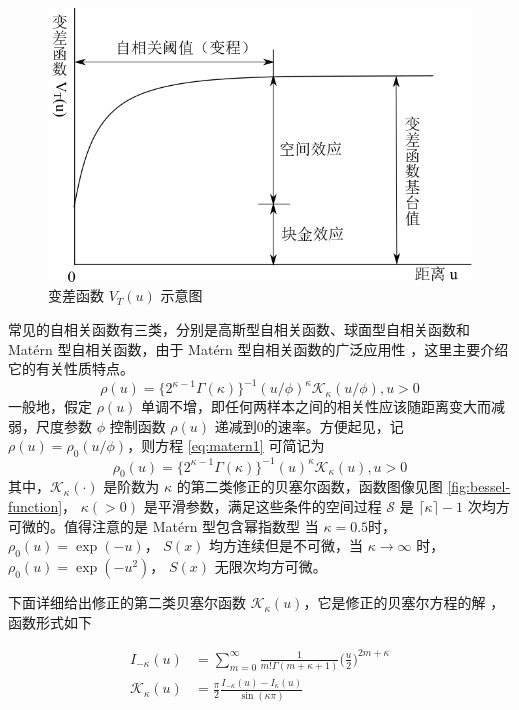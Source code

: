 \documentclass[12pt,a4paper,UTF8,twoside]{book}
\theoremstyle{definition}
\theoremstyle{definition}
\theoremstyle{definition}
\theoremstyle{remark}
\begin{document}
\begin{figure}

{\centering \includegraphics[width=0.7\linewidth]{figures/semi-variance} 

}

\caption{变差函数 $V_{T}(u)$ 示意图}\label{fig:semi-variance}
\end{figure}

常见的自相关函数有三类，分别是高斯型自相关函数、球面型自相关函数和
Matérn 型自相关函数，由于 Matérn 型自相关函数的广泛应用性
\citep{Diggle1998, Diggle2002Childhood, Christensen2004}，这里主要介绍它的有关性质特点。
\begin{equation}
\rho(u)=\{2^{\kappa -1}\Gamma(\kappa)\}^{-1}(u/\phi)^{\kappa}\mathcal{K}_{\kappa}(u/\phi),u > 0 \label{eq:matern1}
\end{equation} \noindent 一般地，假定 \(\rho(u)\)
单调不增，即任何两样本之间的相关性应该随距离变大而减弱，尺度参数
\(\phi\) 控制函数 \(\rho(u)\) 递减到0的速率。方便起见，记
\(\rho(u) = \rho_{0}(u/\phi)\)，则方程 \eqref{eq:matern1} 可简记为
\begin{equation}
\rho_{0}(u)=\{2^{\kappa -1}\Gamma(\kappa)\}^{-1}(u)^{\kappa}\mathcal{K}_{\kappa}(u),u > 0 \label{eq:matern2}
\end{equation} \noindent 其中，\(\mathcal{K}_{\kappa}(\cdot)\) 是阶数为
\(\kappa\) 的第二类修正的贝塞尔函数，函数图像见图
\ref{fig:bessel-function}， \(\kappa(>0)\)
是平滑参数，满足这些条件的空间过程 \(\mathcal{S}\) 是
\(\lceil\kappa\rceil-1\) 次均方可微的。值得注意的是 Matérn
型包含幂指数型 \noindent 当
\(\kappa = 0.5\)时，\(\rho_{0}(u) = \exp(-u)\)， \(S(x)\)
均方连续但是不可微，当 \(\kappa \to \infty\) 时，
\(\rho_{0}(u) = \exp(-u^2)\)， \(S(x)\)
无限次均方可微\citep{Diggle2007}。

下面详细给出修正的第二类贝塞尔函数
\(\mathcal{K}_{\kappa}(u)\)，它是修正的贝塞尔方程的解
\citep{Abramowitz1972}，函数形式如下

\begin{equation}
\begin{aligned}
I_{-\kappa}(u) & =  \sum_{m=0}^{\infty} \frac{1}{m!\Gamma(m + \kappa + 1)} \big(\frac{u}{2}\big)^{2m + \kappa} \\
\mathcal{K}_{\kappa}(u) & = \frac{\pi}{2} \frac{I_{-\kappa}(u) - I_{\kappa}(u)}{\sin (\kappa \pi)}
\end{aligned} \label{eq:besselK-function}
\end{equation}
\end{document}
